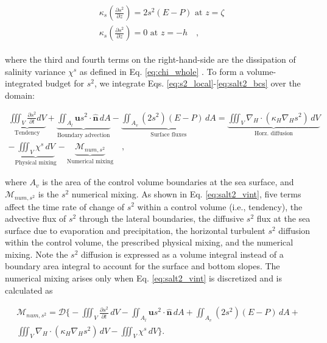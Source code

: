 \documentclass[draft]{agujournal2019}
\begin{document}
\begin{linenomath*}
\begin{align} 
    \begin{split}
        & \kappa_s \left({\frac{\partial s^2}{\partial z}} \right) = 2s^2(E-P) \,\, \textrm{at} \,\, z = \zeta \\
        & \kappa_s \left({\frac{\partial s^2}{\partial z}} \right) = 0 \,\, \textrm{at} \,\, z = -h \label{eq:salt2_bcs} \quad ,
    \end{split}
\end{align}
\end{linenomath*}
where the third and fourth terms on the right-hand-side are the dissipation of salinity variance $\chi^s$ as defined in Eq. \ref{eq:chi_whole} \cite{Burchard_2008}. To form a volume-integrated budget for $s^2$, we integrate Eqs. \ref{eq:s2_local}-\ref{eq:salt2_bcs} over the domain:
\begin{linenomath*}
\begin{equation} \label{eq:salt2_vint}
    \begin{split}
        \underbrace{\iiint_V \frac{\partial s^2}{\partial t}  dV}_{\text{Tendency}} + \underbrace{\iint_{A_l} \mathbf{u}s^2 \cdot \hat{\mathbf{n}} \,  dA}_{\text{Boundary advection}}  - \underbrace{\iint_{A_{v}}(2s^2)(E-P) \, dA}_{\text{Surface fluxes}} = \underbrace{\iiint_{V} \nabla_H \cdot (\kappa_H \nabla_H s^2) \, dV}_{\text{Horz. diffusion}}\\
        -\underbrace{\iiint_V \chi^s \, dV}_{\text{Physical mixing}}-\underbrace{\mathcal{M}_{num, s^2}}_{\text{Numerical mixing}} \quad ,
   \end{split}
\end{equation}
\end{linenomath*}
where $A_v$ is the area of the control volume boundaries at the sea surface, and $\mathcal{M}_{num, s^2}$ is the $s^2$ numerical mixing. As shown in Eq. \ref{eq:salt2_vint}, five terms affect the time rate of change of $s^2$ within a control volume (i.e., tendency), the advective flux of $s^2$ through the lateral boundaries, the diffusive $s^2$ flux at the sea surface due to evaporation and precipitation, the horizontal turbulent $s^2$ diffusion within the control volume, the prescribed physical mixing, and the numerical mixing. Note the $s^2$ diffusion is expressed as a volume integral instead of a boundary area integral to account for the surface and bottom slopes. The numerical mixing arises only when Eq. \ref{eq:salt2_vint} is discretized and is calculated as 
\begin{linenomath*}
\begin{equation} \label{eq:salt2_mnum}
    \begin{split}
        \mathcal{M}_{num, s^2} = \mathcal{D} \biggl\{-\iiint_V \frac{\partial s^2}{\partial t} \, dV - \iint_{A_l} \mathbf{u}s^2 \cdot \hat{\mathbf{n}} \,  dA + \iint_{A_{v}}(2s^2)(E-P) \, dA + \\
        \iiint_{V} \nabla_H \cdot (\kappa_H \nabla_H s^2) \, dV - \iiint_V \chi^s \, dV\biggl\}.
   \end{split}
\end{equation}
\end{linenomath*}
\end{document}
